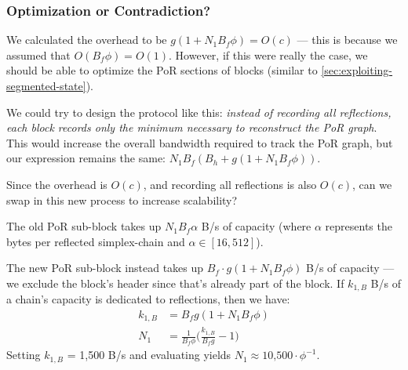 

\subsubsection{Optimization or Contradiction?}

We calculated the overhead to be $g(1+N_1 B_f \phi) = O(c)$ --- this is because we assumed that $O(B_f \phi) = O(1)$.
However, if this were really the case, we should be able to optimize the PoR sections of blocks (similar to \autoref{sec:exploiting-segmented-state}).

We could try to design the protocol like this: \emph{instead of recording all reflections, each block records only the minimum necessary to reconstruct the PoR graph}.
This would increase the overall bandwidth required to track the PoR graph, but our expression remains the same: $N_1 B_f (B_h + g(1 + N_1 B_f \phi))$.

Since the overhead is $O(c)$, and recording all reflections is also $O(c)$, can we swap in this new process to increase scalability?

The old PoR sub-block takes up $N_1 B_f \alpha$ B/s of capacity (where $\alpha$ represents the bytes per reflected simplex-chain and $\alpha \in [16, 512]$).

The new PoR sub-block instead takes up $B_f \cdot g(1 + N_1 B_f \phi)$ B/s of capacity --- we exclude the block's header since that's already part of the block.
If $k_{1,B}$ B/s of a chain's capacity is dedicated to reflections, then we have:
\begin{align}
    k_{1,B} &= B_f g(1 + N_1 B_f \phi) \nonumber \\
    N_1 &= \frac{1}{B_f \phi} \Big(\frac{k_{1,B}}{B_f g} - 1\Big)
    \label{eq:bad-n1-with-phi}
\end{align}
Setting $k_{1,B}$ = 1,500 B/s and evaluating yields $N_1 \approx 10\text{,}500 \cdot \phi^{-1}$.

